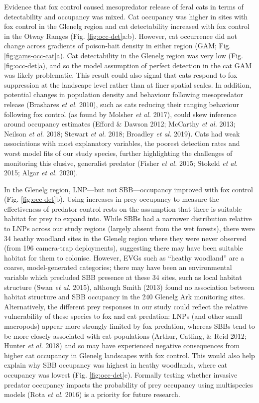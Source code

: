 \documentclass[11pt,a4paper,titlepage,twoside,openright]{style/unimelbthesis}
\begin{document}
\begin{mainmatter}
Evidence that fox control caused mesopredator release of feral cats in terms of detectability and occupancy was mixed. Cat occupancy was higher in sites with fox control in the Glenelg region and cat detectability increased with fox control in the Otway Ranges (Fig. \ref{fig:occ-det}a:b). However, cat occurrence did not change across gradients of poison-bait density in either region (GAM; Fig. \ref{fig:gams-occ-cat}a). Cat detectability in the Glenelg region was very low (Fig. \ref{fig:occ-det}a), and so the model assumption of perfect detection in the cat GAM was likely problematic. This result could also signal that cats respond to fox suppression at the landscape level rather than at finer spatial scales. In addition, potential changes in population density and behaviour following mesopredator release (Brashares \emph{et al.} 2010), such as cats reducing their ranging behaviour following fox control (as found by Molsher \emph{et al.} 2017), could skew inference around occupancy estimates (Efford \& Dawson 2012; McCarthy \emph{et al.} 2013; Neilson \emph{et al.} 2018; Stewart \emph{et al.} 2018; Broadley \emph{et al.} 2019). Cats had weak associations with most explanatory variables, the poorest detection rates and worst model fits of our study species, further highlighting the challenges of monitoring this elusive, generalist predator (Fisher \emph{et al.} 2015; Stokeld \emph{et al.} 2015; Algar \emph{et al.} 2020).

In the Glenelg region, LNP---but not SBB---occupancy improved with fox control (Fig. \ref{fig:occ-det}b). Using increases in prey occupancy to measure the effectiveness of predator control rests on the assumption that there is suitable habitat for prey to expand into. While SBBs had a narrower distribution relative to LNPs across our study regions (largely absent from the wet forests), there were 34 heathy woodland sites in the Glenelg region where they were never observed (from 196 camera-trap deployments), suggesting there may have been suitable habitat for them to colonise. However, EVGs such as ``heathy woodland'' are a coarse, model-generated categories; there may have been an environmental variable which precluded SBB presence at these 34 sites, such as local habitat structure (Swan \emph{et al.} 2015), although Smith (2013) found no association between habitat structure and SBB occupancy in the 240 Glenelg Ark monitoring sites. Alternatively, the different prey responses in our study could reflect the relative vulnerability of these species to fox and cat predation: LNPs (and other small macropods) appear more strongly limited by fox predation, whereas SBBs tend to be more closely associated with cat populations (Arthur, Catling, \& Reid 2012; Hunter \emph{et al.} 2018) and so may have experienced negative consequences from higher cat occupancy in Glenelg landscapes with fox control. This would also help explain why SBB occupancy was highest in heathy woodlands, where cat occupancy was lowest (Fig. \ref{fig:occ-det}c). Formally testing whether invasive predator occupancy impacts the probability of prey occupancy using multispecies models (Rota \emph{et al.} 2016) is a priority for future research.


\end{mainmatter}
\end{document}
